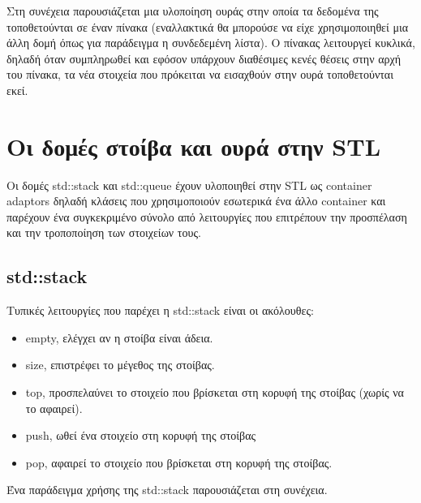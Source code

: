 Στη συνέχεια παρουσιάζεται μια υλοποίηση ουράς στην οποία τα δεδομένα της τοποθετούνται σε έναν πίνακα (εναλλακτικά θα μπορούσε να είχε χρησιμοποιηθεί μια άλλη δομή όπως για παράδειγμα η συνδεδεμένη λίστα). Ο πίνακας λειτουργεί κυκλικά, δηλαδή όταν συμπληρωθεί και εφόσον υπάρχουν διαθέσιμες κενές θέσεις στην αρχή του πίνακα, τα νέα στοιχεία που πρόκειται να εισαχθούν στην ουρά τοποθετούνται εκεί.





\section{Οι δομές στοίβα και ουρά στην STL}
Οι δομές std::stack και std::queue έχουν υλοποιηθεί στην STL ως container adaptors δηλαδή κλάσεις που χρησιμοποιούν εσωτερικά ένα άλλο container και παρέχουν ένα συγκεκριμένο σύνολο από λειτουργίες που επιτρέπουν την προσπέλαση και την τροποποίηση των στοιχείων τους. 

\subsection{std::stack}
Τυπικές λειτουργίες που παρέχει η std::stack είναι οι ακόλουθες:
\begin{itemize}[noitemsep]
\item empty, ελέγχει αν η στοίβα είναι άδεια.
\item size, επιστρέφει το μέγεθος της στοίβας.
\item top, προσπελαύνει το στοιχείο που βρίσκεται στη κορυφή της στοίβας (χωρίς να το αφαιρεί).
\item push, ωθεί ένα στοιχείο στη κορυφή της στοίβας
\item pop, αφαιρεί το στοιχείο που βρίσκεται στη κορυφή της στοίβας.
\end{itemize}

Ένα παράδειγμα χρήσης της std::stack παρουσιάζεται στη συνέχεια.






